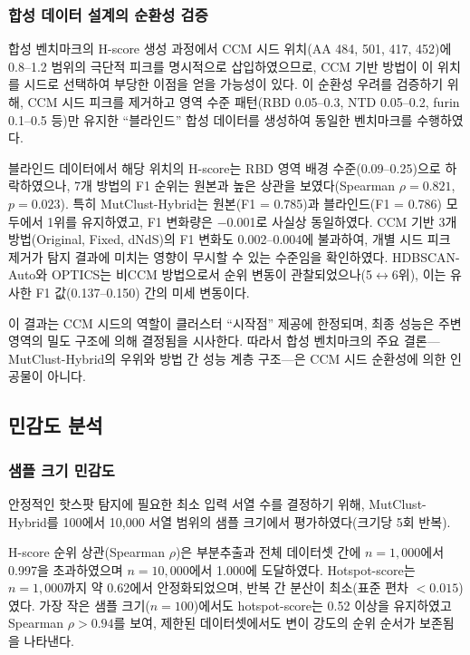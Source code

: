 \subsubsection{합성 데이터 설계의 순환성 검증}
\label{subsec:circularity_validation}

합성 벤치마크의 H-score 생성 과정에서 CCM 시드 위치(AA 484, 501, 417, 452)에 0.8--1.2 범위의 극단적 피크를 명시적으로 삽입하였으므로, CCM 기반 방법이 이 위치를 시드로 선택하여 부당한 이점을 얻을 가능성이 있다.
이 순환성 우려를 검증하기 위해, CCM 시드 피크를 제거하고 영역 수준 패턴(RBD 0.05--0.3, NTD 0.05--0.2, furin 0.1--0.5 등)만 유지한 ``블라인드'' 합성 데이터를 생성하여 동일한 벤치마크를 수행하였다.

블라인드 데이터에서 해당 위치의 H-score는 RBD 영역 배경 수준(0.09--0.25)으로 하락하였으나, 7개 방법의 F1 순위는 원본과 높은 상관을 보였다(Spearman $\rho = 0.821$, $p = 0.023$).
특히 MutClust-Hybrid는 원본(F1 = 0.785)과 블라인드(F1 = 0.786) 모두에서 1위를 유지하였고, F1 변화량은 $-$0.001로 사실상 동일하였다.
CCM 기반 3개 방법(Original, Fixed, dNdS)의 F1 변화도 0.002--0.004에 불과하여, 개별 시드 피크 제거가 탐지 결과에 미치는 영향이 무시할 수 있는 수준임을 확인하였다.
HDBSCAN-Auto와 OPTICS는 비CCM 방법으로서 순위 변동이 관찰되었으나(5$\leftrightarrow$6위), 이는 유사한 F1 값(0.137--0.150) 간의 미세 변동이다.

이 결과는 CCM 시드의 역할이 클러스터 ``시작점'' 제공에 한정되며, 최종 성능은 주변 영역의 밀도 구조에 의해 결정됨을 시사한다.
따라서 합성 벤치마크의 주요 결론---MutClust-Hybrid의 우위와 방법 간 성능 계층 구조---은 CCM 시드 순환성에 의한 인공물이 아니다.


\subsection{민감도 분석}
\label{sec:sensitivity_analysis}


\subsubsection{샘플 크기 민감도}

안정적인 핫스팟 탐지에 필요한 최소 입력 서열 수를 결정하기 위해, MutClust-Hybrid를 100에서 10,000 서열 범위의 샘플 크기에서 평가하였다(크기당 5회 반복).

H-score 순위 상관(Spearman $\rho$)은 부분추출과 전체 데이터셋 간에 $n = 1{,}000$에서 0.997을 초과하였으며 $n = 10{,}000$에서 1.000에 도달하였다.
Hotspot-score는 $n = 1{,}000$까지 약 0.62에서 안정화되었으며, 반복 간 분산이 최소(표준 편차 $< 0.015$)였다.
가장 작은 샘플 크기($n = 100$)에서도 hotspot-score는 0.52 이상을 유지하였고 Spearman $\rho > 0.94$를 보여, 제한된 데이터셋에서도 변이 강도의 순위 순서가 보존됨을 나타낸다.

